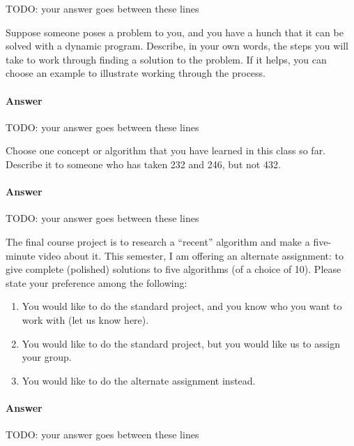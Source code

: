 \documentclass{article}
\begin{document}
TODO: your answer goes between these lines


\nextprob
{}

Suppose someone poses a problem to you, and you have a hunch that it can be
solved with a dynamic program.  Describe, in your own words, the steps you will
take to work through finding a solution to the problem.  If it helps, you can
choose an example to illustrate working through the process.

\paragraph{Answer}


TODO: your answer goes between these lines




\nextprob
{}

Choose one concept or algorithm that you have learned
in this class so far. Describe it to someone who has
taken 232 and 246, but not 432.

\paragraph{Answer}


TODO: your answer goes between these lines


\nextprob
{}

The final course project is to research a ``recent'' algorithm and make a
five-minute video about it.  This semester, I am offering an alternate
assignment: to give complete (polished) solutions to five algorithms (of a
choice of 10).
Please state your preference among the following:

\begin{enumerate}
    \item You would like to do the standard project, and you know who you want
        to work with (let us know here).
    \item You would like to do the standard project, but you would like us to
        assign your group.
    \item You would like to do the alternate assignment instead.
\end{enumerate}

\paragraph{Answer}


TODO: your answer goes between these lines

\end{document}
